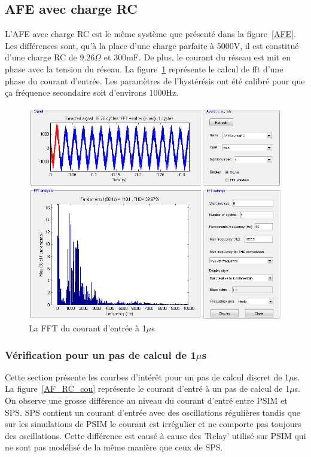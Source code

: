 \documentclass[11pt,letterpaper,final]{report}
\begin{document}
\clearpage
\subsection{AFE avec charge RC}
L'AFE avec charge RC est le même système que présenté dans la figure~\ref{AFE}. Les différences sont, qu'à la place d'une charge parfaite à 5000V, il est constitué d'une charge RC de 9.26$\Omega$ et 300mF.
De plus, le courant du réseau est mit en phase avec la tension du réseau. La figure~\ref{fft_RC} représente le calcul de fft d'une phase du courant d'entrée. Les paramètres de l'hystérésis ont été calibré pour que ça fréquence secondaire soit d'environs 1000Hz.

\begin{figure}[htb]
\centering
\includegraphics[scale=0.5]{Fig/AFERC/FFTAnalysisToolResult5u.png}
\caption{La FFT du courant d'entrée à 1$\mu$s}
\label{fft_RC}
\end{figure}


\subsubsection{Vérification pour un pas de calcul de 1$\mu$s}
Cette section présente les courbes d'intérêt pour un pas de calcul discret de 1$\mu$s. La figure~\ref{AF_RC_cou} représente le courant d'entré à un pas de calcul de 1$\mu$s. On observe une grosse différence au niveau du courant d'entré entre PSIM et SPS. SPS contient un courant d'entrée avec des oscillations régulières tandis que sur les simulations de PSIM le courant est irrégulier et ne comporte pas toujours des oscillations. Cette différence est causé à cause des 'Relay' utilisé sur PSIM qui ne sont pas modélisé de la même manière que ceux de SPS.
\end{document}
